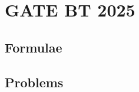 \documentclass[journal]{IEEEtran}
\begin{document}
\newpage


\tableofcontents

\newpage
\onecolumn


\renewcommand{\thetable}{\theenumi}

\section{GATE BT 2025}
\subsection{Formulae}

\newpage
\subsection{Problems}

\end{document}
